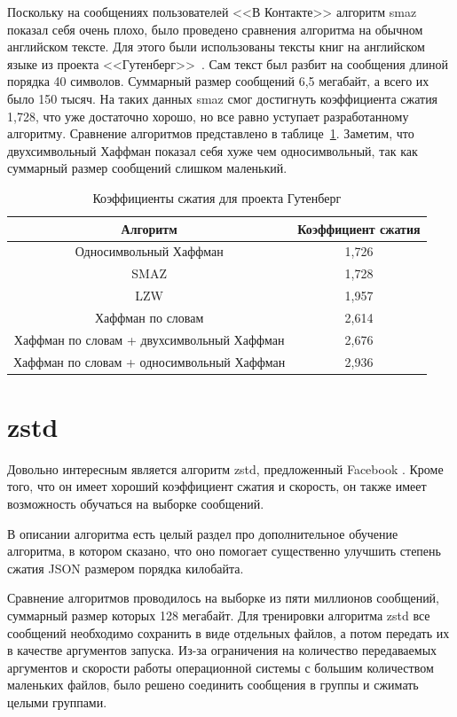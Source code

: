Поскольку на сообщениях пользователей <<В Контакте>> алгоритм smaz показал себя очень плохо, было проведено сравнения алгоритма на обычном английском тексте.
Для этого были использованы тексты книг на английском языке из проекта <<Гутенберг>>~\cite{gutenberg}. Сам текст был разбит на сообщения длиной порядка 40 символов.
Суммарный размер сообщений 6,5 мегабайт, а всего их было 150 тысяч. На таких данных smaz смог достигнуть коэффициента сжатия 1,728, что уже достаточно хорошо,
но все равно уступает разработанному алгоритму. Сравнение алгоритмов представлено в таблице~\ref{tab2}. Заметим, что двухсимвольный Хаффман
показал себя хуже чем односимвольный, так как суммарный размер сообщений слишком маленький.

\begin{table}[!h]
\caption{Коэффициенты сжатия для проекта Гутенберг}\label{tab2}
\centering
\begin{tabular}{|*{2}{c|}}\hline
Алгоритм & Коэффициент сжатия \\\hline
Односимвольный Хаффман & 1,726 \\\hline
SMAZ & 1,728 \\\hline
LZW & 1,957 \\\hline
Хаффман по словам & 2,614 \\\hline
Хаффман по словам + двухсимвольный Хаффман & 2,676 \\\hline
Хаффман по словам + односимвольный Хаффман & 2,936 \\\hline
\end{tabular}
\end{table}


\section{zstd}

Довольно интересным является алгоритм zstd, предложенный Facebook \cite{facebook}. Кроме того,
что он имеет хороший коэффициент сжатия и скорость, он также имеет возможность обучаться на выборке сообщений.

В описании алгоритма есть целый раздел про дополнительное обучение алгоритма, в котором сказано, что оно помогает существенно улучшить степень сжатия JSON размером порядка килобайта.

Сравнение алгоритмов проводилось на выборке из пяти миллионов сообщений, суммарный размер которых 128 мегабайт. Для тренировки алгоритма zstd все сообщений необходимо сохранить в виде отдельных файлов, а потом передать их в качестве аргументов запуска. Из-за ограничения на количество передаваемых аргументов и скорости работы операционной системы с большим количеством маленьких файлов, было 
решено соединить сообщения в группы и сжимать целыми группами.

